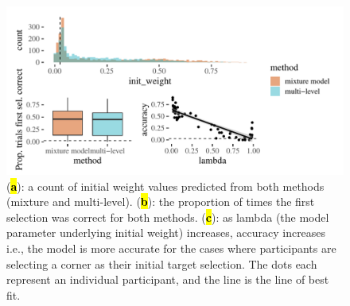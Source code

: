 \documentclass[vision,article,accept,pdftex,moreauthors]{Definitions/mdpi}
\begin{document}
\begin{figure}[H]
\includegraphics[width=13.8 cm]{Figures/qjep_init_sel_preds.pdf}
\caption{({\textbf{\hl{a}}}): a count of initial weight values predicted from both methods (mixture and multi-level). ({\textbf{\hl{b}}}): the proportion of times the first selection was correct for both methods.  ({\textbf{\hl{c}}}): as lambda (the model parameter underlying initial weight) increases, accuracy increases i.e., the model is more accurate for the cases where participants are selecting a corner as their initial target selection. The dots each represent an individual participant, and the line is the line of best fit.}%



\end{figure}
\end{document}
